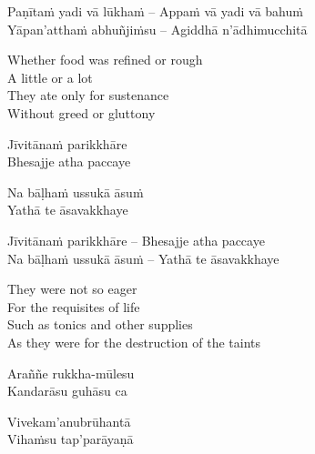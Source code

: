 \else

\begin{verses}
  Paṇītaṁ yadi vā lūkhaṁ – Appaṁ vā yadi vā bahuṁ\\
  Yāpan'atthaṁ abhuñjiṁsu – Agiddhā n'ādhimucchitā
\end{verses}

\fi

\begin{english-verses}
  Whether food was refined or rough\\
  A little or a lot\\
  They ate only for sustenance\\
  Without greed or gluttony
\end{english-verses}

\ifbfive\clearpage\fi

\ifninebythirteen

\begin{pali-hang-verses}
  Jīvitānaṁ parikkhāre\\
  Bhesajje atha paccaye
\end{pali-hang-verses}
\begin{pali-hang-together}
  Na bāḷhaṁ ussukā āsuṁ\\
  Yathā te āsavakkhaye
\end{pali-hang-together}

\else

\begin{verses}
  Jīvitānaṁ parikkhāre – Bhesajje atha paccaye\\
  Na bāḷhaṁ ussukā āsuṁ – Yathā te āsavakkhaye
\end{verses}

\fi

\ifafive\clearpage\fi

\begin{english-verses}
  They were not so eager\\
  For the requisites of life\\
  Such as tonics and other supplies\\
  As they were for the destruction of the taints
\end{english-verses}

\ifninebythirteen

\begin{pali-hang-verses}
  Araññe rukkha-mūlesu\\
  Kandarāsu guhāsu ca
\end{pali-hang-verses}
\begin{pali-hang-together}
  Vivekam'anubrūhantā\\
  Vihaṁsu tap'parāyaṇā
\end{pali-hang-together}

